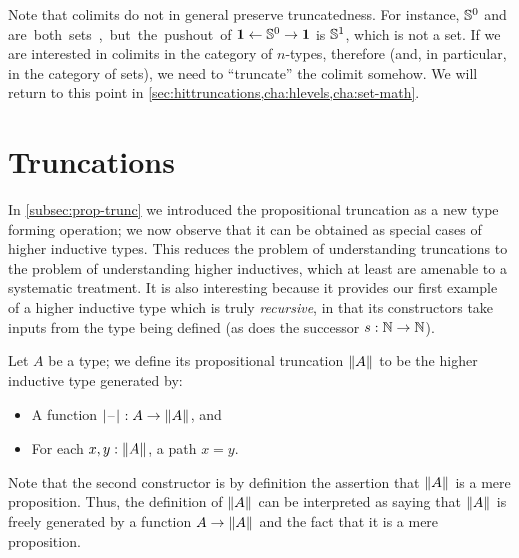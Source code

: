 \begin{rmk}
  Note that colimits do not in general preserve truncatedness.
  For instance, $\mathbb{S}^0$ and \unit are both sets, but the pushout of $\mathbf{1} \leftarrow \mathbb{S}^0 \to \mathbf{1}$ is $\mathbb{S}^1$, which is not a set.
  If we are interested in colimits in the category of $n$-types, therefore (and, in particular, in the category of sets), we need to ``truncate'' the colimit somehow.
  We will return to this point in \autoref{sec:hittruncations,cha:hlevels,cha:set-math}.
\end{rmk}



\section{Truncations}
\label{sec:hittruncations}

In \autoref{subsec:prop-trunc} we introduced the propositional truncation as a new type forming operation;
we now observe that it can be obtained as special cases of higher inductive types.
This reduces the problem of understanding truncations to the problem of understanding higher inductives, which at least are amenable to a systematic treatment.
It is also interesting because it provides our first example of a higher inductive type which is truly \emph{recursive}, in that its constructors take inputs from the type being defined (as does the successor $s:\mathbb{N}\to\mathbb{N}$).

Let $A$ be a type; we define its propositional truncation $\mathopen{}\left\Vert A\right\Vert_{}\mathclose{}$ to be the higher inductive type generated by:
\begin{itemize}
\item A function $|\mathord{\hspace{1pt}\text{--}\hspace{1pt}}|_{} : A \to \mathopen{}\left\Vert A\right\Vert_{}\mathclose{}$, and
\item For each $x,y:\mathopen{}\left\Vert A\right\Vert_{}\mathclose{}$, a path $x=y$.
\end{itemize}
Note that the second constructor is by definition the assertion that $\mathopen{}\left\Vert A\right\Vert_{}\mathclose{}$ is a mere proposition.
Thus, the definition of $\mathopen{}\left\Vert A\right\Vert_{}\mathclose{}$ can be interpreted as saying that $\mathopen{}\left\Vert A\right\Vert_{}\mathclose{}$ is freely generated by a function $A\to\mathopen{}\left\Vert A\right\Vert_{}\mathclose{}$ and the fact that it is a mere proposition.

